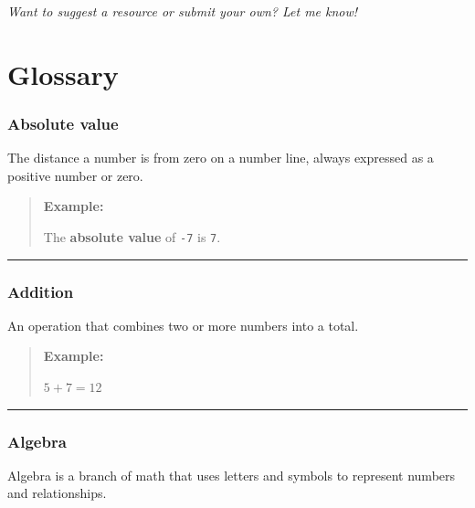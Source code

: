 \documentclass[
  letterpaper,
  DIV=11,
  numbers=noendperiod]{scrreprt}
\begin{document}
\emph{Want to suggest a resource or submit your own? Let me know!}


\chapter*{Glossary}\label{glossary}


\subsection*{Absolute value}\label{glossary-absolute-value}

The distance a number is from zero on a number line, always expressed as
a positive number or zero.

\begin{quote}
\textbf{Example:}

The \textbf{absolute value} of \texttt{-7} is \texttt{7}.
\end{quote}

\begin{center}\rule{0.5\linewidth}{0.5pt}\end{center}

\subsection*{Addition}\label{glossary-addition}

An operation that combines two or more numbers into a total.

\begin{quote}
\textbf{Example:}

\(5 + 7 = 12\)
\end{quote}

\begin{center}\rule{0.5\linewidth}{0.5pt}\end{center}

\subsection*{Algebra}\label{glossary-algebra}

Algebra is a branch of math that uses letters and symbols to represent
numbers and relationships.
\end{document}
